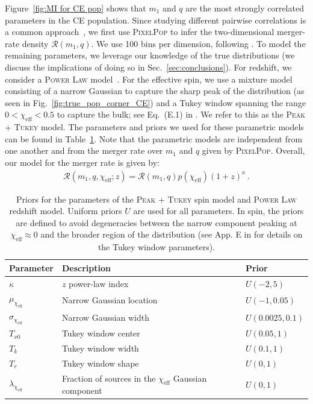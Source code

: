 \documentclass[twocolumn, twocolappendix]{aastex631}
\newcommand{\chieff}{\ensuremath{\chi_\mathrm{eff}}}
\newcommand{\pr}{\textsc{Power Law}\xspace}
\newcommand{\PixelPop}{\textsc{PixelPop}\xspace}
\newcommand{\PeakTukey}{\textsc{Peak + Tukey}\xspace}
\begin{document}
Figure~\ref{fig:MI for CE pop} shows that $m_1$ and $q$ are the most strongly correlated parameters in the \ac{CE} population. Since studying different pairwise correlations is a common approach~\citep{Heinzel:2024hva}, we first use \PixelPop to infer the two-dimensional merger-rate density $\mathcal{R}(m_1,q)$. We use 100 bins per dimension, following \citet{Heinzel:2024jlc}. To model the remaining parameters, we leverage our knowledge of the true distributions (we discuss the implications of doing so in Sec.~\ref{sec:conclusions}). For redshift, we consider a \pr model~\citep{Fishbach:2018edt}. For the effective spin, we use a mixture model consisting of a narrow Gaussian to capture the sharp peak of the distribution (as seen in Fig.~\ref{fig:true_pop_corner_CE}) and a Tukey window spanning the range $0 < \chieff < 0.5$ to capture the bulk; see Eq.~(E.1) in \citet{Vitale:2022dpa}. We refer to this as the \PeakTukey model.
%
The parameters and priors we used for these parametric models can be found in Table~\ref{tab:parametric-params}. Note that the parametric models are independent from one another and from the merger rate over $m_1$ and $q$ given by \PixelPop. Overall, our model for the merger rate is given by:
\begin{align}
\mathcal{R} ( m_1 , q , \chi_\mathrm{eff} ; z )
=
\mathcal{R} ( m_1, q)
p ( \chieff ) (1+z)^{\kappa}
\, .
\label{eq: 2d rate}
\end{align}

\begin{table}
\renewcommand{\arraystretch}{1.25}
\centering
\begin{tabular}{lll}
\hline\hline
\textbf{Parameter} & \textbf{Description} & \textbf{Prior} \\ \hline
$\kappa$ & $z$ power-law index & $U(-2, 5)$       \\ \hline
$\mu_{\chieff}$ & Narrow Gaussian location  & $U(-1, 0.05)$ \\
$\sigma_{\chieff}$  & Narrow Gaussian width     & $U(0.0025, 0.1)$ \\
$T_{x0}$ & Tukey window center & $U(0.05, 1)$ \\
$T_k$ & Tukey window width & $U(0.1, 1)$ \\
$T_r$ & Tukey window shape & $U(0, 1)$ \\
$\lambda_{\chieff}$ & 
\begin{minipage}[t]{0.4\linewidth}
  \raggedright 
  Fraction of sources in the $\chi_{\mathrm{eff}}$ Gaussian component
\end{minipage} & $U(0, 1)$ \\ \hline\hline
\end{tabular}
\caption{Priors for the parameters of the \PeakTukey spin model and \pr redshift model. Uniform priors $U$ are used for all parameters. In spin, the priors are defined to avoid degeneracies between the narrow component peaking at $\chieff\approx0$ and the broader region of the distribution (see App. E in \citet{Vitale:2022dpa} for details on the Tukey window parameters).
}
\label{tab:parametric-params}
\end{table}
\end{document}
